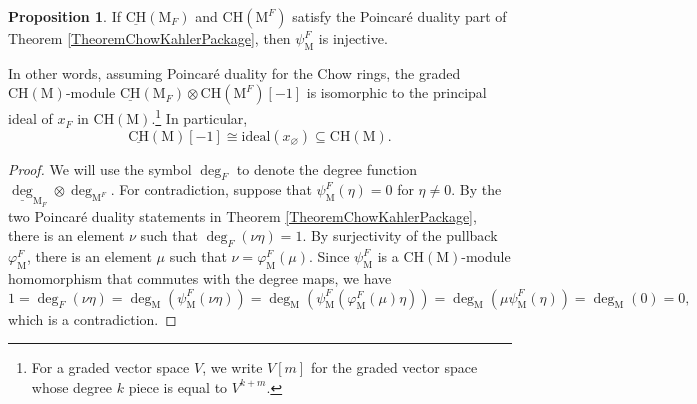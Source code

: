 \documentclass[11pt,reqno]{amsart}
\theoremstyle{definition}
\newtheorem{proposition}[theorem]{Proposition}
\theoremstyle{remark}
\renewcommand{\(}{\left(}
\renewcommand{\)}{\right)}
\newcommand{\<}{\left<}
\renewcommand{\>}{\right>}
\begin{document}

\begin{proposition}\label{PropositionPushforwardI}
If   $\underline{\mathrm{CH}}(\mathrm{M}_F)$ and $\mathrm{CH}(\mathrm{M}^F)$ satisfy the Poincar\'e duality part of Theorem \ref{TheoremChowKahlerPackage},
then %
 $\psi_\mathrm{M}^F$ is injective.
\end{proposition}

In other words, assuming Poincar\'e duality for the Chow rings, the graded $\mathrm{CH}(\mathrm{M})$-module $ \underline{\mathrm{CH}}(\mathrm{M}_F) \otimes \mathrm{CH}(\mathrm{M}^F)[-1]$ 
is isomorphic to  the principal ideal of $x_F$ in $\mathrm{CH}(\mathrm{M})$.\footnote{For a graded vector space $V$, we write $V[m]$ for the graded vector space whose degree $k$ piece is equal to $V^{k+m}$.}
In particular,
\[
\underline{\mathrm{CH}}(\mathrm{M})[-1] \cong \text{ideal}(x_\varnothing) \subseteq \mathrm{CH}(\mathrm{M}).
\]

\begin{proof}
% 
We will use the symbol $\deg_F$ to denote the degree function $\underline{\deg}_{\mathrm{M}_F} \otimes \deg_{\mathrm{M}^F}$.
For contradiction, suppose that $\psi^F_{\mathrm{M}}(\eta)=0$ for $\eta \neq 0$.
By the two Poincar\'e duality statements in Theorem \ref{TheoremChowKahlerPackage},
there is an element $\nu$  such that $\deg_F(\nu \eta)=1$.
By surjectivity of the pullback $\varphi^F_\mathrm{M}$,
there is an element $\mu$ such that $\nu=\varphi^F_{\mathrm{M}}(\mu)$.
Since $\psi^F_{\mathrm{M}}$ is a $\mathrm{CH}(\mathrm{M})$-module homomorphism that commutes with the degree maps,  we have
\[
1=\deg_F(\nu\eta)= \deg_{\mathrm{M}}( \psi^F_{\mathrm{M}} (\nu \eta))= \deg_{\mathrm{M}}( \psi^F_{\mathrm{M}} ( \varphi^F_{\mathrm{M}}(\mu) \eta))
= \deg_{\mathrm{M}}(\mu  \psi^F_{\mathrm{M}} ( \eta))
=\deg_{\mathrm{M}}(0)=0,
\]
which is a contradiction.
\end{proof}
\end{document}
